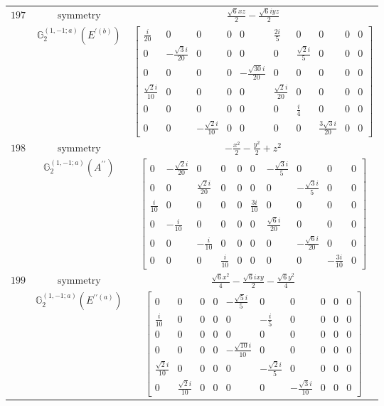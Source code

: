 \documentclass[fleqn,8pt,landscape]{jsarticle}
\begin{document}
\begin{longtable}{ccc}
$ 197 $ & $ \text{symmetry} $ & $ \frac{\sqrt{6} x z}{2} - \frac{\sqrt{6} i y z}{2} $ \\
$  $ & $ \mathbb{G}_{2}^{(1,-1;a)}(E^{\prime(b)}) $ & $ \begin{bmatrix} \frac{i}{20} & 0 & 0 & 0 & 0 & \frac{2 i}{5} & 0 & 0 & 0 & 0 \\ 0 & - \frac{\sqrt{3} i}{20} & 0 & 0 & 0 & 0 & \frac{\sqrt{2} i}{5} & 0 & 0 & 0 \\ 0 & 0 & 0 & 0 & - \frac{\sqrt{30} i}{20} & 0 & 0 & 0 & 0 & 0 \\ \frac{\sqrt{2} i}{10} & 0 & 0 & 0 & 0 & \frac{\sqrt{2} i}{20} & 0 & 0 & 0 & 0 \\ 0 & 0 & 0 & 0 & 0 & 0 & \frac{i}{4} & 0 & 0 & 0 \\ 0 & 0 & - \frac{\sqrt{2} i}{10} & 0 & 0 & 0 & 0 & \frac{3 \sqrt{3} i}{20} & 0 & 0 \end{bmatrix} $ \\ \hline
$ 198 $ & $ \text{symmetry} $ & $ - \frac{x^{2}}{2} - \frac{y^{2}}{2} + z^{2} $ \\
$  $ & $ \mathbb{G}_{2}^{(1,-1;a)}(A^{\prime\prime}) $ & $ \begin{bmatrix} 0 & - \frac{\sqrt{2} i}{20} & 0 & 0 & 0 & 0 & - \frac{\sqrt{3} i}{5} & 0 & 0 & 0 \\ 0 & 0 & \frac{\sqrt{2} i}{20} & 0 & 0 & 0 & 0 & - \frac{\sqrt{3} i}{5} & 0 & 0 \\ \frac{i}{10} & 0 & 0 & 0 & 0 & \frac{3 i}{10} & 0 & 0 & 0 & 0 \\ 0 & - \frac{i}{10} & 0 & 0 & 0 & 0 & \frac{\sqrt{6} i}{20} & 0 & 0 & 0 \\ 0 & 0 & - \frac{i}{10} & 0 & 0 & 0 & 0 & - \frac{\sqrt{6} i}{20} & 0 & 0 \\ 0 & 0 & 0 & \frac{i}{10} & 0 & 0 & 0 & 0 & - \frac{3 i}{10} & 0 \end{bmatrix} $ \\ \hline
$ 199 $ & $ \text{symmetry} $ & $ \frac{\sqrt{6} x^{2}}{4} - \frac{\sqrt{6} i x y}{2} - \frac{\sqrt{6} y^{2}}{4} $ \\
$  $ & $ \mathbb{G}_{2}^{(1,-1;a)}(E^{\prime\prime(a)}) $ & $ \begin{bmatrix} 0 & 0 & 0 & 0 & - \frac{\sqrt{5} i}{5} & 0 & 0 & 0 & 0 & 0 \\ \frac{i}{10} & 0 & 0 & 0 & 0 & - \frac{i}{5} & 0 & 0 & 0 & 0 \\ 0 & 0 & 0 & 0 & 0 & 0 & 0 & 0 & 0 & 0 \\ 0 & 0 & 0 & 0 & - \frac{\sqrt{10} i}{10} & 0 & 0 & 0 & 0 & 0 \\ \frac{\sqrt{2} i}{10} & 0 & 0 & 0 & 0 & - \frac{\sqrt{2} i}{5} & 0 & 0 & 0 & 0 \\ 0 & \frac{\sqrt{2} i}{10} & 0 & 0 & 0 & 0 & - \frac{\sqrt{3} i}{10} & 0 & 0 & 0 \end{bmatrix} $ \\ \hline

\end{longtable}
\end{document}
